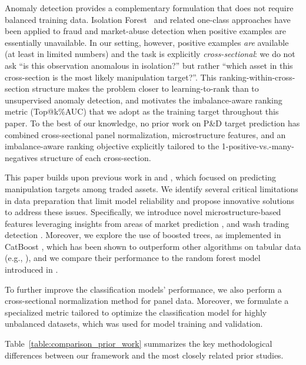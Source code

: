 \documentclass{ieeeaccess}
\begin{document}
Anomaly detection provides a complementary formulation that does not require balanced training data. Isolation Forest~\cite{liu2008isolation} and related one-class approaches have been applied to fraud and market-abuse detection when positive examples are essentially unavailable. In our setting, however, positive examples \emph{are} available (at least in limited numbers) and the task is explicitly \emph{cross-sectional}: we do not ask ``is this observation anomalous in isolation?'' but rather ``which asset in this cross-section is the most likely manipulation target?''. This ranking-within-cross-section structure makes the problem closer to learning-to-rank than to unsupervised anomaly detection, and motivates the imbalance-aware ranking metric (Top@k\%AUC) that we adopt as the training target throughout this paper. To the best of our knowledge, no prior work on P\&D target prediction has combined cross-sectional panel normalization, microstructure features, and an imbalance-aware ranking objective explicitly tailored to the 1-positive-vs.-many-negatives structure of each cross-section.


This paper builds upon previous work in \cite{pd_anatomy} and \cite{hu2023sequence}, which focused on predicting manipulation targets among traded assets. We identify several critical limitations in data preparation that limit model reliability and propose innovative solutions to address these issues. Specifically, we introduce novel microstructure-based features leveraging insights from areas of market prediction \cite{albers_frag_2022}, \cite{ntakaris_midprice_2022} and wash trading detection \cite{cong_washtrading_2023}. Moreover, we explore the use of boosted trees, as implemented in CatBoost \cite{catboost}, which has been shown to outperform other algorithms on tabular data (e.g., \cite{grinsztajn_2022}), and we compare their performance to the random forest model introduced in \cite{random_forest_2001}.

To further improve the classification models' performance, we also perform a cross-sectional normalization method for panel data. Moreover, we formulate a specialized metric tailored to optimize the classification model for highly unbalanced datasets, which was used for model training and validation.

Table~\ref{table:comparison_prior_work} summarizes the key methodological differences between our framework and the most closely related prior studies.
\end{document}
